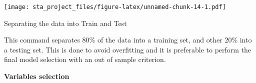 \documentclass[
]{article}
\newenvironment{Shaded}{\begin{snugshade}}{\end{snugshade}}
\newcommand{\DataTypeTok}[1]{\textcolor[rgb]{0.13,0.29,0.53}{#1}}
\newcommand{\DecValTok}[1]{\textcolor[rgb]{0.00,0.00,0.81}{#1}}
\newcommand{\FloatTok}[1]{\textcolor[rgb]{0.00,0.00,0.81}{#1}}
\newcommand{\KeywordTok}[1]{\textcolor[rgb]{0.13,0.29,0.53}{\textbf{#1}}}
\newcommand{\NormalTok}[1]{#1}
\newcommand{\OperatorTok}[1]{\textcolor[rgb]{0.81,0.36,0.00}{\textbf{#1}}}
\newcommand{\OtherTok}[1]{\textcolor[rgb]{0.56,0.35,0.01}{#1}}
\newcommand{\StringTok}[1]{\textcolor[rgb]{0.31,0.60,0.02}{#1}}
\begin{document}
\texttt{[image: sta\_project\_files/figure-latex/unnamed-chunk-14-1.pdf]}

Separating the data into Train and Test

\begin{Shaded}
\end{Shaded}

This command separates 80\% of the data into a training set, and other
20\% into a testing set. This is done to avoid overfitting and it is
preferable to perform the final model selection with an out of sample
criterion.

\textbf{Variables selection}
\end{document}
